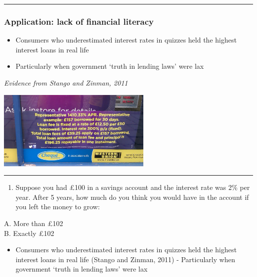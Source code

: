 \documentclass[]{article}
\providecommand{\tightlist}{%
  \setlength{\itemsep}{0pt}\setlength{\parskip}{0pt}}
\begin{document}
\begin{center}\rule{0.5\linewidth}{\linethickness}\end{center}

\hypertarget{application-lack-of-financial-literacy}{%
\subsubsection{Application: lack of financial
literacy}\label{application-lack-of-financial-literacy}}

\begin{itemize}
\tightlist
\item
  Consumers who underestimated interest rates in quizzes held the
  highest interest loans in real life
\item
  Particularly when government `truth in lending laws' were lax
\end{itemize}

\emph{Evidence from Stango and Zinman, 2011}

\includegraphics[height=1.5in]{picsfigs/paydayloan.png}

\begin{center}\rule{0.5\linewidth}{\linethickness}\end{center}

\begin{enumerate}
\def\labelenumi{\arabic{enumi}.}
\tightlist
\item
  Suppose you had \pounds100 in a savings account and the interest rate
  was 2\% per year. After 5 years, how much do you think you would have
  in the account if you left the money to grow:~
\end{enumerate}

A. More than \pounds102\\

B. Exactly \pounds102\\

\begin{itemize}
\tightlist
\item
  Consumers who underestimated interest rates in quizzes held the
  highest interest loans in real life (Stango and Zinman, 2011) -
  Particularly when government `truth in lending laws' were lax
\end{itemize}
\end{document}

